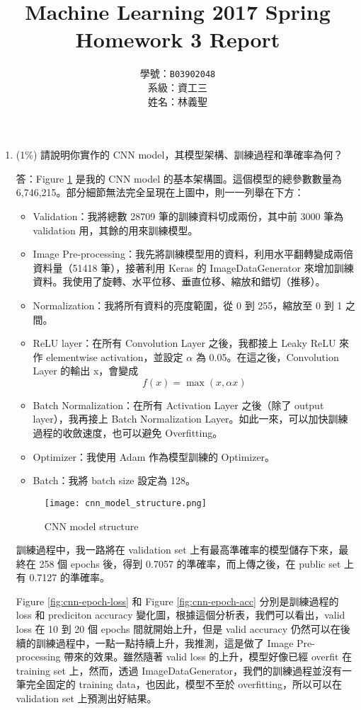 \documentclass[12pt,a4paper]{extarticle}
\title{Machine Learning 2017 Spring\\Homework 3 Report}
\author{學號：\texttt{B03902048}\\系級：資工三\\姓名：林義聖}
\date{}
\begin{document}
\maketitle

\begin{enumerate}
	\item (1\%) 請說明你實作的 CNN model，其模型架構、訓練過程和準確率為何？
	\par 答：Figure \ref{fig:cnn-model-structure} 是我的 CNN model 的基本架構圖。這個模型的總參數數量為 6,746,215。部分細節無法完全呈現在上圖中，則一一列舉在下方：
  \begin{itemize}
    \item Validation：我將總數 28709 筆的訓練資料切成兩份，其中前 3000 筆為 validation 用，其餘的用來訓練模型。
    \item Image Pre-processing：我先將訓練模型用的資料，利用水平翻轉變成兩倍資料量（51418 筆），接著利用 Keras 的 ImageDataGenerator 來增加訓練資料。我使用了旋轉、水平位移、垂直位移、縮放和錯切（推移）。
    \item Normalization：我將所有資料的亮度範圍，從 0 到 255，縮放至 0 到 1 之間。
    \item ReLU layer：在所有 Convolution Layer 之後，我都接上 Leaky ReLU 來作 elementwise activation，並設定 $\alpha$ 為 0.05。在這之後，Convolution Layer 的輸出 x，會變成
    $$f(x) = \max(x, \alpha x)$$
    \item Batch Normalization：在所有 Activation Layer 之後（除了 output layer），我再接上 Batch Normalization Layer。如此一來，可以加快訓練過程的收斂速度，也可以避免 Overfitting。
    \item Optimizer：我使用 Adam 作為模型訓練的 Optimizer。
    \item Batch：我將 batch size 設定為 128。
  \end{itemize}

  \begin{figure}[ht]
    \centering
    \texttt{[image: cnn\_model\_structure.png]}
    \caption{CNN model structure}
    \label{fig:cnn-model-structure}
  \end{figure}

  \par 訓練過程中，我一路將在 validation set 上有最高準確率的模型儲存下來，最終在 258 個 epochs 後，得到 0.7057 的準確率，而上傳之後，在 public set 上有 0.7127 的準確率。
  \par Figure \ref{fig:cnn-epoch-loss} 和 Figure \ref{fig:cnn-epoch-acc} 分別是訓練過程的 loss 和 prediciton accuracy 變化圖，根據這個分析表，我們可以看出，valid loss 在 10 到 20 個 epochs 間就開始上升，但是 valid accuracy 仍然可以在後續的訓練過程中，一點一點持續上升，我推測，這是做了 Image Pre-processing 帶來的效果。雖然隨著 valid loss 的上升，模型好像已經 overfit 在 training set 上，然而，透過 ImageDataGenerator，我們的訓練過程並沒有一筆完全固定的 training data，也因此，模型不至於 overfitting，所以可以在 validation set 上預測出好結果。


\end{enumerate}
\end{document}
